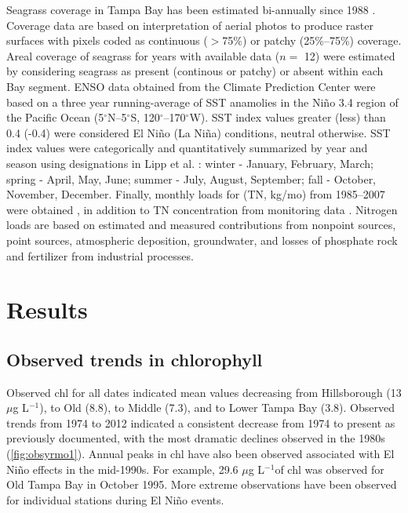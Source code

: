\documentclass{svjour3}\usepackage[]{graphicx}\usepackage[]{color}
\newcommand{\mugl}{$\mu$g L$^{-1}$}
\begin{document}
Seagrass coverage in Tampa Bay has been estimated bi-annually since 1988 \cite{Tomasko05}.  Coverage data are based on interpretation of aerial photos to produce raster surfaces with pixels coded as continuous ($>$75\%) or patchy (25\%--75\%) coverage.  Areal coverage of seagrass for years with available data ($n=$ 12) were estimated by considering seagrass as present (continous or patchy) or absent within each Bay segment.  \ac{ENSO} data obtained from the Climate Prediction Center \cite{CPC13} were based on a three year running-average of \ac{SST} anamolies in the Ni\~{n}o 3.4 region of the Pacific Ocean (5$^{\circ}$N--5$^{\circ}$S, 120$^{\circ}$--170$^{\circ}$W).  \ac{SST} index values greater (less) than 0.4 (-0.4) were considered El Ni\~{n}o (La Ni\~{n}a) conditions, neutral otherwise.  \ac{SST} index values were categorically and quantitatively summarized by year and season using designations in Lipp et al. \cite{Lipp01}: winter - January, February, March; spring - April, May, June; summer - July, August, September; fall - October, November, December.  Finally, monthly loads for  (\acs{TN}, kg/mo) from 1985--2007 were obtained \cite{Zarbock94,Pribble01,Poe05}, in addition to \ac{TN} concentration from monitoring data \cite{TBEP11}.  Nitrogen loads are based on estimated and measured contributions from nonpoint sources, point sources, atmospheric deposition, groundwater, and losses of phosphate rock and fertilizer from industrial processes.

\section{Results}

\subsection{Observed trends in chlorophyll}

Observed \ac{chl} for all dates indicated mean values decreasing from Hillsborough (13 \mugl), to Old (8.8), to Middle (7.3), and to Lower Tampa Bay (3.8).  Observed trends from 1974 to 2012 indicated a consistent decrease from 1974 to present as previously documented, with the most dramatic declines observed in the 1980s (\cref{fig:obsyrmo1}).  Annual peaks in \ac{chl} have also been observed associated with El Ni\~{n}o effects \cite{Greening06} in the mid-1990s.  For example, 29.6 \mugl of \ac{chl} was observed for Old Tampa Bay in October 1995.  More extreme observations have been observed for individual stations during El Ni\~{n}o events. 
\end{document}

